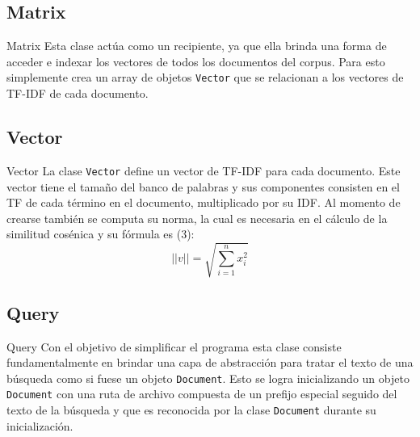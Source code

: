 \subsection{Matrix}
\begin{frame}[fragile]{Matrix}
    Esta clase actúa como un recipiente, ya que ella brinda una forma de acceder e indexar los
vectores de todos los documentos del corpus. Para esto simplemente crea un array de objetos \texttt{Vector}
que se relacionan a los vectores de TF-IDF de cada documento.
\end{frame}

\subsection{Vector}
\begin{frame}[fragile]{Vector}
    La clase \texttt{Vector} define un vector de TF-IDF para cada documento. Este vector tiene el tamaño del
banco de palabras y sus componentes consisten en el TF de cada término en el documento, multiplicado por su IDF.
Al momento de crearse también se computa su norma, la cual es necesaria en el cálculo de la similitud
cosénica y su fórmula es (3):
\begin{equation}
    ||v|| = \sqrt{\sum_{i=1}^{n} x_i^2}
\end{equation}
\end{frame}


\subsection{Query}
\begin{frame}[fragile]{Query}
    Con el objetivo de simplificar el programa esta clase consiste fundamentalmente
en brindar una capa de abstracción para tratar el texto de una búsqueda como si fuese
un objeto \texttt{Document}. Esto se logra inicializando un objeto \texttt{Document} con
una ruta de archivo compuesta de un prefijo especial seguido del texto de la búsqueda y que es
reconocida por la clase \texttt{Document} durante su inicialización.
\end{frame}
